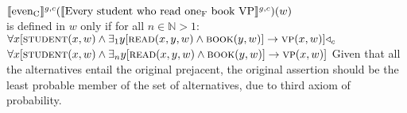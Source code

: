 \ex
$\intension[g,c]{even\textsubscript{C}}(\intension[g,c]{Every student who read one\textsubscript{F} book VP})(w)$\\is defined in $w$ only if for all $n\in\mathbb{N}>1$:\\$\forall{x}[\predicate{student}(x,w)\land\exists_1{y}[\predicate{read}(x,y,w)\land\predicate{book}(y,w)]\rightarrow\predicate{vp}(x,w)]\lprob_c$\\\emptyfill$\forall{x}[\predicate{student}(x,w)\land\exists_n{y}[\predicate{read}(x,y,w)\land\predicate{book}(y,w)]\rightarrow\predicate{vp}(x,w)]$
\xe
Given that all the alternatives entail the original prejacent, the original assertion should be the least probable member of the set of alternatives, due to  third axiom of probability.

